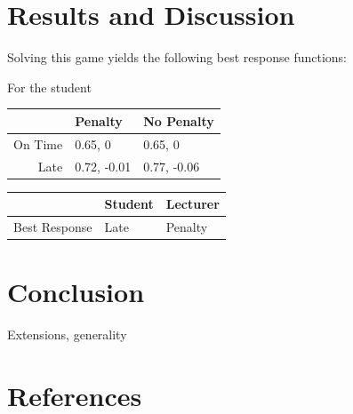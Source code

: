 \documentclass[11pt,preprint, authoryear]{elsarticle}
\let\origtable\table
\let\endorigtable\endtable
\renewenvironment{table}[1][2] {
    \expandafter\origtable\expandafter[H]
} {
    \endorigtable
}
\numberwithin{equation}{section}
\numberwithin{figure}{section}
\numberwithin{table}{section}
\begin{document}
\hypertarget{results-and-discussion}{%
\section{\texorpdfstring{Results and Discussion
\label{result}}{Results and Discussion }}\label{results-and-discussion}}

Solving this game yields the following best response functions:

For the student

\begin{table}[H]
\centering
\begin{tabular}{rll}
  \toprule
 & Penalty & No Penalty \\ 
  \midrule
On Time & 0.65, 0 & 0.65, 0 \\ 
  Late & 0.72, -0.01 & 0.77, -0.06 \\ 
   \bottomrule
\end{tabular}
\caption{Simultaneous Game Best Response \label{tab2}} 
\end{table}
\begin{table}[H]
\centering
\begin{tabular}{rll}
  \toprule
 & Student & Lecturer \\ 
  \midrule
Best Response & Late & Penalty \\ 
   \bottomrule
\end{tabular}
\caption{Best Response\label{tab3}} 
\end{table}

\hypertarget{conclusion}{%
\section{\texorpdfstring{Conclusion
\label{con}}{Conclusion }}\label{conclusion}}

Extensions, generality \newpage

\hypertarget{references}{%
\section*{References}\label{references}}
\end{document}
